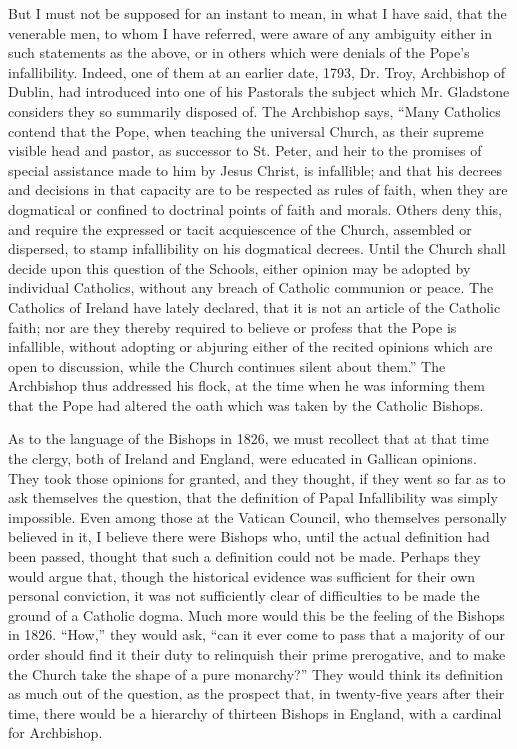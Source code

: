 But I must not be supposed for an instant to mean, in what I have
said, that the venerable men, to whom I have referred, were aware of any
ambiguity either in such statements as the above, or in others which
were denials of the Pope's infallibility. Indeed, one of them at an
earlier date, 1793, Dr. Troy, Archbishop of Dublin, had introduced into
one of his Pastorals the subject which Mr. Gladstone considers they so
summarily disposed of. The Archbishop says, ``Many Catholics contend
that the Pope, when teaching the universal Church, as their supreme
visible head and pastor, as successor to St. Peter, and heir to the
promises of special assistance made to him by Jesus Christ, is
infallible; and that his decrees and decisions in that capacity are to
be respected as rules of faith, when they are dogmatical or confined to
doctrinal points of faith and morals. Others deny this, and require the
expressed or tacit acquiescence of the Church, assembled or dispersed,
to stamp infallibility on his dogmatical decrees. Until the Church shall
decide upon this question of the Schools, either opinion may be adopted
by individual Catholics, without any breach of Catholic communion or
peace. The Catholics of Ireland have lately declared, that it is not an
article of the Catholic faith; nor are they thereby required to believe
or profess that the Pope is infallible, without adopting or abjuring
either of the recited opinions which are open to discussion, while the
Church continues silent about them.'' The Archbishop thus addressed
his flock, at the time when he was informing them that the Pope had
altered the oath which was taken by the Catholic Bishops.

As to the language of the Bishops in 1826, we must recollect that at
that time the clergy, both of Ireland and England, were educated in
Gallican opinions. They took those opinions for granted, and they
thought, if they went so far as to ask themselves the question, that the
definition of Papal Infallibility was simply impossible. Even among
those at the Vatican Council, who themselves personally believed in it,
I believe there were Bishops who, until the actual definition had been
passed, thought that such a definition could not be made. Perhaps they
would argue that, though the historical evidence was sufficient for
their own personal conviction, it was not sufficiently clear of
difficulties to be made the ground of a Catholic dogma. Much more would
this be the feeling of the Bishops in 1826. ``How,'' they would
ask, ``can it ever come to pass that a majority of our order should
find it their duty to relinquish their prime prerogative, and to make
the Church take the shape of a pure monarchy?'' They would think its
definition as much out of the question, as the prospect that, in
twenty-five years after their time, there would be a hierarchy of
thirteen Bishops in England, with a cardinal for Archbishop.

